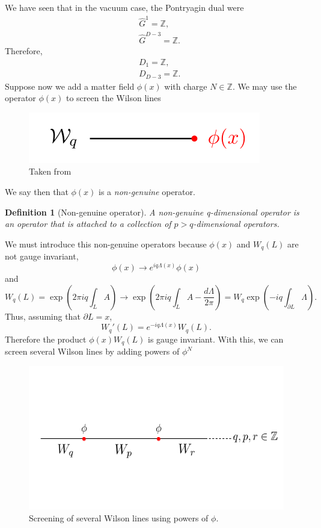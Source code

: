 \documentclass{article}
\newtheorem{definition}{Definition}
\begin{document}
We have seen that in the vacuum case, the Pontryagin dual were 
\begin{align*}
	&\widehat{G}^1=\mathbb{Z},\\
	&\widehat{G}^{D-3}=\mathbb{Z}.
\end{align*}
Therefore, 
\begin{align*}
	&D_1=\mathbb{Z},\\
	&D_{D-3}=\mathbb{Z}.
\end{align*}
Suppose now we add a matter field $\phi(x)$ with charge $N\in\mathbb{Z}$. We may use the operator $\phi(x)$ to screen the Wilson lines
\begin{figure}[H]
	\centering
	\includegraphics[scale=0.4]{figures/screening_wilson.png}
	\caption{Taken from \cite{Bhardwaj}}
\end{figure}
\noindent We say then that $\phi(x)$ is a \textit{non-genuine} operator. 
\begin{definition}[Non-genuine operator]
A non-genuine q-dimensional operator is an operator that is attached to a collection of $p>q$-dimensional operators. 
\end{definition}
We must introduce this non-genuine operators because $\phi(x)$ and $W_q(L)$ are not gauge invariant, 
\begin{equation}
	\phi(x)\to e^{iq\Lambda(x)}\phi(x)
\end{equation}
and 
\begin{equation}
	W_q(L)=\exp\left(2\pi iq\int_LA\right)\to\exp\left(2\pi iq\int_L A-\frac{d\Lambda}{2\pi}\right)=W_q\exp\left(-iq\int_{\partial L}\Lambda\right).
\end{equation}
Thus, assuming that $\partial L=x$, 
\begin{equation}
	W_q'(L)=e^{-iq\Lambda(x)}W_q(L).
\end{equation}
Therefore the product $\phi(x)W_q(L)$ is gauge invariant. With this, we can screen several Wilson lines by adding powers of $\phi^N$
\begin{figure}[H]
	\centering
	\includegraphics[scale=0.4]{figures/screening_wilson_n.png}
	\caption{Screening of several Wilson lines using powers of $\phi$.}
\end{figure}
\end{document}
